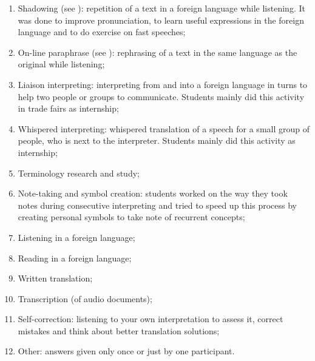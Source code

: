 \documentclass[output=paper]{../langscibook}
\begin{document}
\begin{enumerate}[noitemsep]\label{list:01:categories}\sloppy
\item Shadowing (see ): repetition of a text in a foreign language while listening. It was done to improve pronunciation, to learn useful expressions in the foreign language and to do exercise on fast speeches;
\item On-line paraphrase (see ): rephrasing of a text in the same language as the original while listening;
\item Liaison interpreting: interpreting from and into a foreign language in turns to help two people or groups to communicate. Students mainly did this activity in trade fairs as internship;
\item Whispered interpreting: whispered translation of a speech for a small group of people, who is next to the interpreter. Students mainly did this activity as internship;
\item Terminology research and study;
\item Note-taking and symbol creation: students worked on the way they took notes during consecutive interpreting and tried to speed up this process by creating personal symbols to take note of recurrent concepts;
\item Listening in a foreign language;
\item Reading in a foreign language;
\item Written translation;
\item Transcription (of audio documents);
\item Self-correction: listening to your own interpretation to assess it, correct mistakes and think about better translation solutions;
\item Other: answers given only once or just by one participant.
\end{enumerate}
\end{document}
